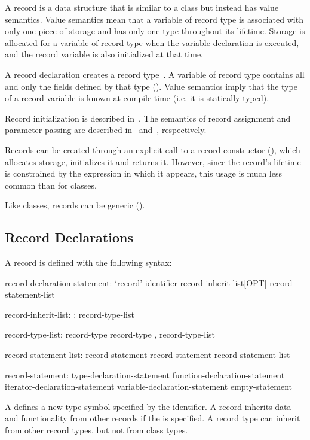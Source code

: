 \label{Records}

A record is a data structure that is similar to a class but instead has value
semantics.  Value semantics mean that a variable of record type is associated
with only one piece of storage and has only one type throughout its lifetime.
Storage is allocated for a variable of record type when the variable declaration
is executed, and the record variable is also initialized at that time.

A record declaration creates a record type~.  A
variable of record type contains all and only the fields defined by that type
().  Value semantics imply that the type of a record variable
is known at compile time (i.e. it is statically typed).  


Record initialization is described in~.  The
semantics of record assignment and parameter passing are described
in~ and~, respectively.

Records can be created through an explicit call to a record
constructor (), which allocates storage, initializes
it and returns it.  However, since the record's lifetime is constrained by the
expression in which it appears, this usage is much less common than for classes.

Like classes, records can be generic ().


\subsection{Record Declarations}
\label{Record_Declarations}

A record is defined with the following syntax:
\begin{syntax}
record-declaration-statement:
  `record' identifier record-inherit-list[OPT] {
    record-statement-list }

record-inherit-list:
  : record-type-list

record-type-list:
  record-type
  record-type , record-type-list

record-statement-list:
  record-statement
  record-statement record-statement-list

record-statement:
  type-declaration-statement
  function-declaration-statement
  iterator-declaration-statement
  variable-declaration-statement
  empty-statement
\end{syntax}
A  defines a new type symbol specified by the
identifier.  A record inherits data and functionality from other records
if the  is specified.  A record type can inherit from
other record types, but not from class types.

